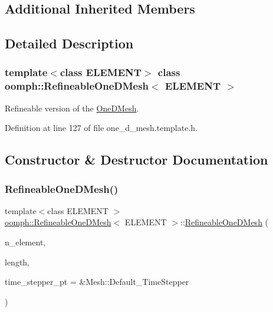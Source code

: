 \subsection*{Additional Inherited Members}


\subsection{Detailed Description}
\subsubsection*{template$<$class E\+L\+E\+M\+E\+NT$>$\newline
class oomph\+::\+Refineable\+One\+D\+Mesh$<$ E\+L\+E\+M\+E\+N\+T $>$}

Refineable version of the \hyperlink{classoomph_1_1OneDMesh}{One\+D\+Mesh}. 

Definition at line 127 of file one\+\_\+d\+\_\+mesh.\+template.\+h.



\subsection{Constructor \& Destructor Documentation}
\mbox{\label{classoomph_1_1RefineableOneDMesh_afd56915c8d1092fe6063184431c2d322}} 
\subsubsection{\texorpdfstring{Refineable\+One\+D\+Mesh()}{RefineableOneDMesh()}\hspace{0.1cm}{\footnotesize\ttfamily [1/2]}}
{\footnotesize\ttfamily template$<$class E\+L\+E\+M\+E\+NT $>$ \\
\hyperlink{classoomph_1_1RefineableOneDMesh}{oomph\+::\+Refineable\+One\+D\+Mesh}$<$ E\+L\+E\+M\+E\+NT $>$\+::\hyperlink{classoomph_1_1RefineableOneDMesh}{Refineable\+One\+D\+Mesh} (\begin{DoxyParamCaption}\item[{const unsigned \&}]{n\+\_\+element,  }\item[{const double \&}]{length,  }\item[{Time\+Stepper $\ast$}]{time\+\_\+stepper\+\_\+pt = {\ttfamily \&Mesh\+:\+:Default\+\_\+TimeStepper} }\end{DoxyParamCaption})\hspace{0.3cm}{\ttfamily [inline]}}



